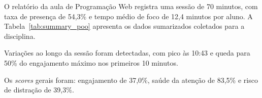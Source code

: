 O relatório da aula de Programação Web registra uma sessão de 70 minutos, com taxa de presença de 54,3\% e tempo médio de foco de 12,4 minutos por aluno. A Tabela~\ref{tab:summary_poo} apresenta os dados sumarizados coletados para a disciplina.



Variações ao longo da sessão foram detectadas, com pico às 10:43 e queda para 50\% do engajamento máximo nos primeiros 10 minutos.

Os \textit{scores} gerais foram: engajamento de 37,0\%, saúde da atenção de 83,5\% e risco de distração de 39,3\%.
